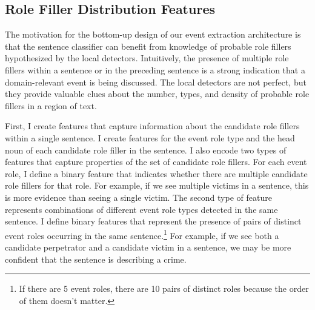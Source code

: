 
\subsection{Role Filler Distribution Features}
\label{cand-role-fillers}


The motivation for the bottom-up design of our event extraction
architecture is that the sentence classifier can benefit from
knowledge of probable role fillers hypothesized by the local
detectors. Intuitively, the presence of multiple role fillers within a
sentence or in the preceding sentence is a strong indication that a
domain-relevant event is being discussed. The local detectors are not
perfect, but they provide valuable clues about the number, types, and density of
probable role fillers in a region of text.

First, I create features that capture information about the
candidate role fillers within a single sentence.
I create features for the
event role type and the head noun of each candidate role filler in the 
sentence.  
I also encode two types of features that capture properties of  the set of
candidate role fillers.  For each event role, I define a binary feature
that indicates whether there are multiple candidate role
fillers for that role. For example, if we see multiple victims
in a sentence, this is more evidence than seeing a single victim. The second type of feature
represents combinations of different event role types detected in the
same sentence. 
I define 
binary features that represent the presence
of pairs of distinct event roles occurring in the same
sentence.\footnote{
If there are 5 event roles, there are 10 pairs
  of distinct roles because the order of them doesn't matter.}
For example, if we see both a candidate perpetrator and a candidate victim in
a sentence, we may be more confident that the sentence is describing
a crime.


